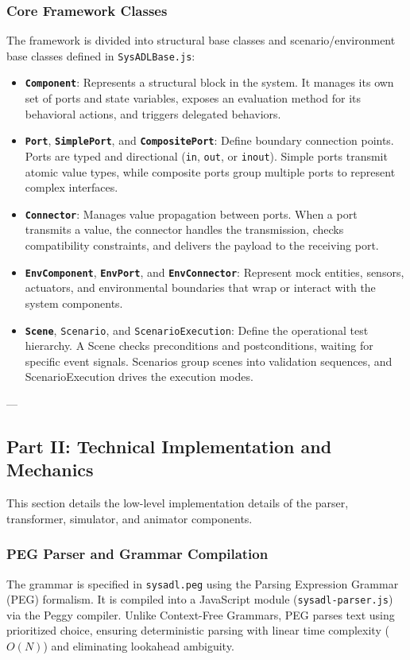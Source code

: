\subsubsection{Core Framework Classes}
The framework is divided into structural base classes and scenario/environment base classes defined in \texttt{SysADLBase.js}:
\begin{itemize}
    \item \textbf{\texttt{Component}}: Represents a structural block in the system. It manages its own set of ports and state variables, exposes an evaluation method for its behavioral actions, and triggers delegated behaviors.
    \item \textbf{\texttt{Port}}, \textbf{\texttt{SimplePort}}, and \textbf{\texttt{CompositePort}}: Define boundary connection points. Ports are typed and directional (\texttt{in}, \texttt{out}, or \texttt{inout}). Simple ports transmit atomic value types, while composite ports group multiple ports to represent complex interfaces.
    \item \textbf{\texttt{Connector}}: Manages value propagation between ports. When a port transmits a value, the connector handles the transmission, checks compatibility constraints, and delivers the payload to the receiving port.
    \item \textbf{\texttt{EnvComponent}}, \textbf{\texttt{EnvPort}}, and \textbf{\texttt{EnvConnector}}: Represent mock entities, sensors, actuators, and environmental boundaries that wrap or interact with the system components.
    \item \textbf{\texttt{Scene}}, \texttt{Scenario}, and \texttt{ScenarioExecution}: Define the operational test hierarchy. A Scene checks preconditions and postconditions, waiting for specific event signals. Scenarios group scenes into validation sequences, and ScenarioExecution drives the execution modes.
\end{itemize}

---

\subsection{Part II: Technical Implementation and Mechanics}

This section details the low-level implementation details of the parser, transformer, simulator, and animator components.

\subsubsection{PEG Parser and Grammar Compilation}
The grammar is specified in \texttt{sysadl.peg} using the Parsing Expression Grammar (PEG) formalism. It is compiled into a JavaScript module (\texttt{sysadl-parser.js}) via the Peggy compiler. Unlike Context-Free Grammars, PEG parses text using prioritized choice, ensuring deterministic parsing with linear time complexity ($O(N)$) and eliminating lookahead ambiguity. 

